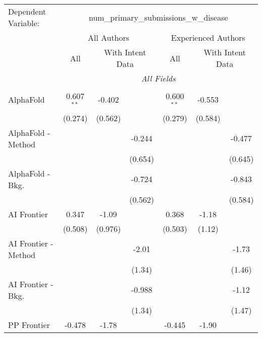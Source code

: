 \begingroup
\centering
\begin{tabular}{lcccccc}
   \tabularnewline \midrule \midrule
   Dependent Variable: & \multicolumn{6}{c}{num\_primary\_submissions\_w\_disease}\\
 & \multicolumn{3}{c}{All Authors} & \multicolumn{3}{c}{Experienced Authors} \\
\cmidrule(lr){2-4} \cmidrule(lr){5-7}
 & \multicolumn{1}{c}{All} & \multicolumn{2}{c}{With Intent Data} & \multicolumn{1}{c}{All} & \multicolumn{2}{c}{With Intent Data} \\
\cmidrule(lr){2-2} \cmidrule(lr){3-4} \cmidrule(lr){5-5} \cmidrule(lr){6-7}
 & \multicolumn{6}{c}{\textit{All Fields}} \\ \\
   AlphaFold            & 0.607$^{**}$ & -0.402  &               & 0.600$^{**}$ & -0.553  &   \\   
                        & (0.274)      & (0.562) &               & (0.279)      & (0.584) &   \\   
   AlphaFold - Method   &              &         & -0.244        &              &         & -0.477\\   
                        &              &         & (0.654)       &              &         & (0.645)\\   
   AlphaFold - Bkg.     &              &         & -0.724        &              &         & -0.843\\   
                        &              &         & (0.562)       &              &         & (0.584)\\   
   AI Frontier          & 0.347        & -1.09   &               & 0.368        & -1.18   &   \\   
                        & (0.508)      & (0.976) &               & (0.503)      & (1.12)  &   \\   
   AI Frontier - Method &              &         & -2.01         &              &         & -1.73\\   
                        &              &         & (1.34)        &              &         & (1.46)\\   
   AI Frontier - Bkg.   &              &         & -0.988        &              &         & -1.12\\   
                        &              &         & (1.34)        &              &         & (1.47)\\   
   PP Frontier          & -0.478       & -1.78   &               & -0.445       & -1.90   &   \\   

\end{tabular}
